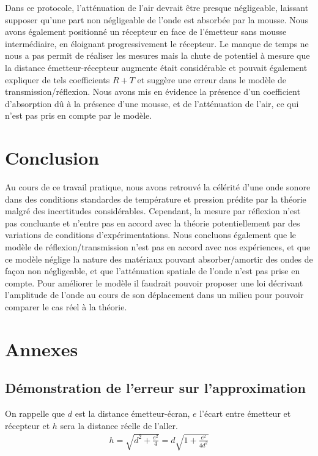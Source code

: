 \documentclass[12pt]{article}
\begin{document}
Dans ce protocole, l'atténuation de l'air devrait être presque négligeable, laissant supposer qu'une part non négligeable de l'onde est absorbée par la mousse. Nous avons également positionné un récepteur en face de 
l'émetteur sans mousse intermédiaire, en éloignant progressivement le récepteur. Le manque de temps ne nous a pas permit de réaliser les mesures mais la chute de potentiel à mesure que la distance émetteur-récepteur augmente
était considérable et pouvait également expliquer de tels coefficients $R+T$ et suggère une erreur dans le modèle de transmission/réflexion. Nous avons mis en évidence la présence d'un coefficient d'absorption dû à la présence
d'une mousse, et de l'atténuation de l'air, ce qui n'est pas pris en compte par le modèle.

\section{Conclusion}
Au cours de ce travail pratique, nous avons retrouvé la célérité d'une onde sonore dans des conditions standardes de température et pression prédite par la théorie malgré des incertitudes considérables.
Cependant, la mesure par réflexion n'est pas concluante et n'entre pas en accord avec la théorie potentiellement par des variations de conditions d'expérimentations. Nous concluons également
que le modèle de réflexion/transmission n'est pas en accord avec nos expériences, et que ce modèle néglige la nature des matériaux pouvant absorber/amortir des ondes de façon non négligeable, et que l'atténuation
spatiale de l'onde n'est pas prise en compte. Pour améliorer le modèle il faudrait pouvoir proposer une loi décrivant l'amplitude de l'onde au cours de son déplacement dans un milieu pour pouvoir comparer le cas réel à la théorie.

\break
\section*{Annexes}
\subsection*{Démonstration de l'erreur sur l'approximation}
On rappelle que $d$ est la distance émetteur-écran, $e$ l'écart entre émetteur et récepteur et $h$ sera la distance réelle de l'aller.
\begin{align}
	h = \sqrt{d^2 + \frac{e^2}{4}} = d\sqrt{1+ \frac{e^2}{4d^2}}
\end{align}
\end{document}
